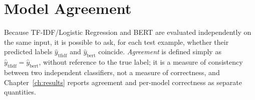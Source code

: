 \section{Model Agreement}

Because TF-IDF/Logistic Regression and BERT are evaluated independently on the same input, it is possible to ask, for each test example, whether their predicted labels $\hat{y}_{\mathrm{tfidf}}$ and $\hat{y}_{\mathrm{bert}}$ coincide. \emph{Agreement} is defined simply as $\hat{y}_{\mathrm{tfidf}} = \hat{y}_{\mathrm{bert}}$, without reference to the true label; it is a measure of consistency between two independent classifiers, not a measure of correctness, and Chapter~\ref{ch:results} reports agreement and per-model correctness as separate quantities.

